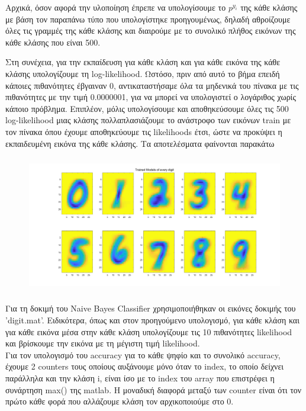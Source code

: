 \documentclass{article}
\begin{document}
	\noindent
	Aρχικά, όσον αφορά την υλοποίηση έπρεπε να υπολογίσουμε το $p^{y_{i}}$ της κάθε κλάσης με βάση τον παραπάνω τύπο που υπολογίστηκε προηγουμένως, δηλαδή αθροίζουμε όλες τις γραμμές της κάθε κλάσης και διαιρούμε με το συνολικό πλήθος εικόνων της κάθε κλάσης που είναι 500.
	
	\noindent
	Στη συνέχεια, για την εκπαίδευση για κάθε κλάση και για κάθε εικόνα της κάθε κλάσης υπολογίζουμε τη log-likelihood. Ωστόσο, πριν από αυτό το βήμα επειδή κάποιες πιθανότητες έβγαιναν 0, αντικαταστήσαμε όλα τα μηδενικά του πίνακα με τις πιθανότητες με την τιμή 0.0000001, για να μπορεί να υπολογιστεί ο λογάριθος χωρίς κάποιο πρόβλημα. Επιπλέον, μόλις υπολογίσουμε και αποθηκεύσουμε όλες τις 500 log-likelihood μιας κλάσης πολλαπλασιάζουμε το ανάστροφο των εικόνων train με τον πίνακα όπου έχουμε αποθηκεύουμε τις likelihoods έτσι, ώστε να προκύψει η εκπαιδευμένη εικόνα της κάθε κλάσης. Τα αποτελέσματα φαίνονται παρακάτω
	
	\begin{figure}[h!]
		\centering
		\includegraphics[height=6cm,width=\linewidth]{../exercise2_4/images/ex4_trained_model.png}
	\end{figure}
	
	\pagebreak
	\noindent
	Για τη δοκιμή του Naive Bayes Classifier χρησιμοποιήθηκαν οι εικόνες δοκιμής του 'digit.mat'. Eιδικότερα, όπως και στον προηγούμενο υπολογισμό, για κάθε κλάση και για κάθε εικόνα μέσα στην κάθε κλάση υπολογίζουμε τις 10 πιθανότητες likelihood και βρίσκουμε την εικόνα με τη μέγιστη τιμή likelihood. \\
	
	\noindent
	Για τον υπολογισμό του accuracy για το κάθε ψηφίο και το συνολικό accuracy, έχουμε 2 counters τους οποίους αυξάνουμε μόνο όταν το index, το οποίο δείχνει παράλληλα και την κλάση i, είναι ίσο με το index του array που επιστρέφει η συνάρτηση max() της matlab. Η μοναδική διαφορά μεταξύ των counter είναι ότι τον πρώτο κάθε φορά που αλλάζουμε κλάση τον αρχικοποιούμε στο 0.\\ 
	
\end{document}
